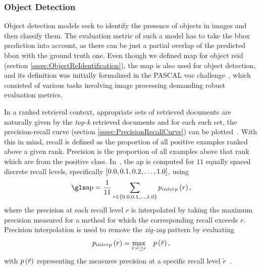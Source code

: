 \subsubsection{Object Detection}

Object detection models seek to identify the presence of objects in images and then classify them. The evaluation metric of such a model has to take the \gls{bbox} prediction into account, as there can be just a partial overlap of the predicted \gls{bbox} with the ground truth one. Even though we defined \gls{map} for object \gls{reid} (section \ref{sssec:ObjectReIdentification}), the \gls{map} is also used for object detection, and its definition was initially formalized in the PASCAL \gls{voc} challenge~\cite{Everingham10}, which consisted of various tasks involving image processing demanding robust evaluation metrics.

In a ranked retrieval context, appropriate sets of retrieved documents are naturally given by the \emph{top-k} retrieved documents and for each such set, the precision-recall curve (section \ref{sssec:PrecisionRecallCurve}) can be plotted~\cite{salton_introduction_1983}. With this in mind, recall is defined as the proportion of all positive examples ranked above a given rank. Precision is the proportion of all examples above that rank which are from the positive class. In~\cite{Everingham10}, the \gls{ap} is computed for $11$ equally spaced discrete recall levels, specifically $\left[ {0.0, 0.1, 0.2, \dots, 1.0} \right]$, using
\begin{equation}
    \AP = \frac{1}{11} \sum_{r \in \cbrackets{0.0, 0.1, \dots, 1.0}} \func{p_{interp}}{r},
\end{equation}
where the precision at each recall level $r$ is interpolated by taking the maximum precision measured for a method for which the corresponding recall exceeds $r$. Precision interpolation is used to remove the \emph{zig-zag} pattern by evaluating
\begin{equation}
    {p_{interp}} \left( r \right) = \underset{\tilde{r}:\tilde{r} \geq r}{\max} \quad {p} \left( \tilde{r} \right),
\end{equation}
with ${p} \left( \tilde{r} \right)$ representing the measures precision at a specific recall level $\tilde{r}$~\cite{Everingham10, salton_introduction_1983}.

